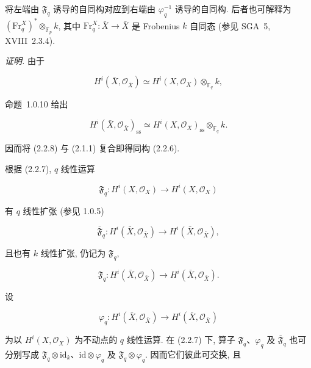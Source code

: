 将左端由 $\mathfrak F_q$ 诱导的自同构对应到右端由 $\varphi_q^{-1}$ 诱导的自同构.
后者也可解释为 $(\mathrm{Fr}_q^X)^*\otimes_{\mathbb F_p}k$,
其中 $\mathrm{Fr}_q^X:\bar X\longrightarrow\bar X$ 是 Frobenius $k$ 自同态
(参见 SGA~5, XVIII~2.3.4).

\medskip
\noindent\emph{证明.}
由于

\begin{equation}\tag{2.2.7}
H^i(\bar X,\mathcal O_{\bar X})\simeq
H^i(X,\mathcal O_X)\otimes_{\mathbb F_q}k,
\end{equation}

命题~1.0.10 给出

\begin{equation}\tag{2.2.8}
H^i(\bar X,\mathcal O_{\bar X})_{\mathrm{ss}}\simeq
H^i(X,\mathcal O_X)_{\mathrm{ss}}\otimes_{\mathbb F_q}k.
\end{equation}

因而将 (2.2.8) 与 (2.1.1) 复合即得同构 (2.2.6).

根据 (2.2.7), $q$ 线性运算

\begin{equation}\tag{2.2.9}
\mathfrak F_q:H^i(X,\mathcal O_X)\longrightarrow H^i(X,\mathcal O_X)
\end{equation}

有 $q$ 线性扩张 (参见 1.0.5)

\begin{equation}\tag{2.2.10}
\overline{\mathfrak F}_q:H^i(\bar X,\mathcal O_{\bar X})
\longrightarrow H^i(\bar X,\mathcal O_{\bar X}),
\end{equation}

且也有 $k$ 线性扩张, 仍记为 $\mathfrak F_q$,

\begin{equation}\tag{2.2.11}
\mathfrak F_q:H^i(\bar X,\mathcal O_{\bar X})
\longrightarrow H^i(\bar X,\mathcal O_{\bar X}).
\end{equation}

设

\begin{equation}\tag{2.2.12}
\varphi_q:H^i(\bar X,\mathcal O_{\bar X})
\longrightarrow H^i(\bar X,\mathcal O_{\bar X})
\end{equation}

为以 $H^i(X,\mathcal O_X)$ 为不动点的 $q$ 线性运算.
在 (2.2.7) 下, 算子 $\mathfrak F_q$、$\varphi_q$ 及 $\overline{\mathfrak F}_q$
也可分别写成 $\mathfrak F_q\otimes\mathrm{id}_k$、$\mathrm{id}\otimes\varphi_q$
及 $\mathfrak F_q\otimes\varphi_q$. 因而它们彼此可交换, 且

